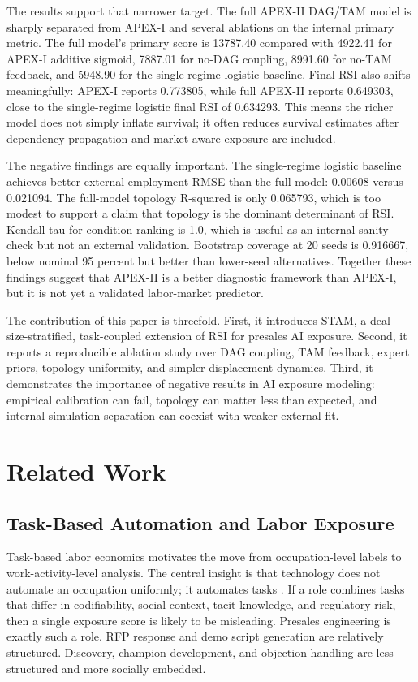 \documentclass[10pt,conference]{IEEEtran}
\begin{document}
The results support that narrower target. The full APEX-II DAG/TAM model is sharply separated from APEX-I and several ablations on the internal primary metric. The full model's primary score is 13787.40 compared with 4922.41 for APEX-I additive sigmoid, 7887.01 for no-DAG coupling, 8991.60 for no-TAM feedback, and 5948.90 for the single-regime logistic baseline. Final RSI also shifts meaningfully: APEX-I reports 0.773805, while full APEX-II reports 0.649303, close to the single-regime logistic final RSI of 0.634293. This means the richer model does not simply inflate survival; it often reduces survival estimates after dependency propagation and market-aware exposure are included.

The negative findings are equally important. The single-regime logistic baseline achieves better external employment RMSE than the full model: 0.00608 versus 0.021094. The full-model topology R-squared is only 0.065793, which is too modest to support a claim that topology is the dominant determinant of RSI. Kendall tau for condition ranking is 1.0, which is useful as an internal sanity check but not an external validation. Bootstrap coverage at 20 seeds is 0.916667, below nominal 95 percent but better than lower-seed alternatives. Together these findings suggest that APEX-II is a better diagnostic framework than APEX-I, but it is not yet a validated labor-market predictor.

The contribution of this paper is threefold. First, it introduces STAM, a deal-size-stratified, task-coupled extension of RSI for presales AI exposure. Second, it reports a reproducible ablation study over DAG coupling, TAM feedback, expert priors, topology uniformity, and simpler displacement dynamics. Third, it demonstrates the importance of negative results in AI exposure modeling: empirical calibration can fail, topology can matter less than expected, and internal simulation separation can coexist with weaker external fit.

\section{Related Work}
\subsection{Task-Based Automation and Labor Exposure}
Task-based labor economics motivates the move from occupation-level labels to work-activity-level analysis. The central insight is that technology does not automate an occupation uniformly; it automates tasks \cite{acemoglu2019automation}. If a role combines tasks that differ in codifiability, social context, tacit knowledge, and regulatory risk, then a single exposure score is likely to be misleading. Presales engineering is exactly such a role. RFP response and demo script generation are relatively structured. Discovery, champion development, and objection handling are less structured and more socially embedded.
\end{document}
